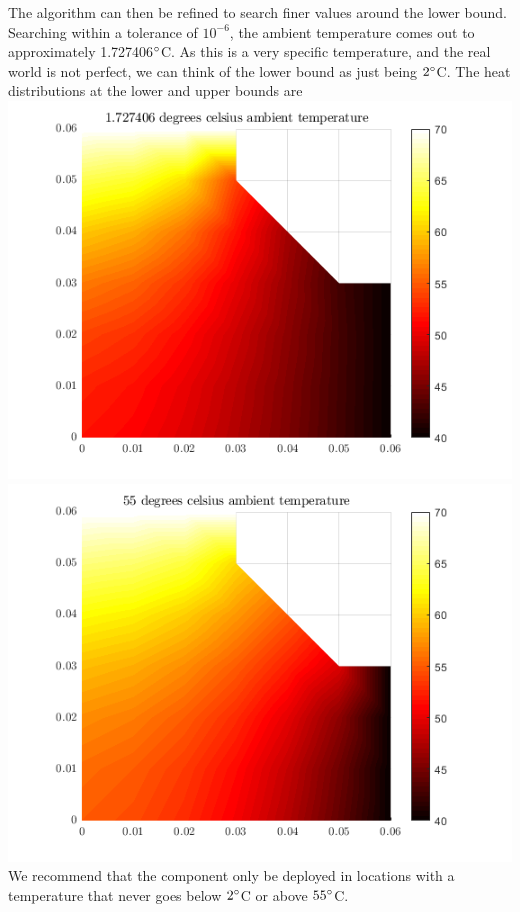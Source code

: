 \documentclass[12pt,a4paper]{article}
\begin{document}
The algorithm can then be refined to search finer values around the lower bound. Searching within a tolerance of $10^{-6}$, the ambient temperature comes out to approximately 1.727406$\degree$C. As this is a very specific temperature, and the real world is not perfect, we can think of the lower bound as just being $2\degree$C. The heat distributions at the lower and upper bounds are\\\includegraphics[width=\textwidth]{images/coldplate.png}\\\includegraphics[width=\textwidth]{images/hotplate.png}
We recommend that the component only be deployed in locations with a temperature that never goes below $2\degree$C or above $55\degree$C.
\end{document}
